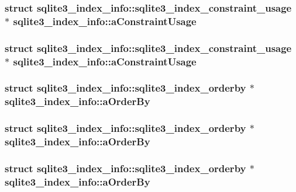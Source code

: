 \subsubsection{\setlength{\rightskip}{0pt plus 5cm}struct \bf{sqlite3\_\-index\_\-info::sqlite3\_\-index\_\-constraint\_\-usage} $\ast$ \bf{sqlite3\_\-index\_\-info::a\-Constraint\-Usage}}\label{structsqlite3__index__info_7f177b25117e4425b2bc509076cb7c31}


\subsubsection{\setlength{\rightskip}{0pt plus 5cm}struct \bf{sqlite3\_\-index\_\-info::sqlite3\_\-index\_\-constraint\_\-usage} $\ast$ \bf{sqlite3\_\-index\_\-info::a\-Constraint\-Usage}}\label{structsqlite3__index__info_7f177b25117e4425b2bc509076cb7c31}


\subsubsection{\setlength{\rightskip}{0pt plus 5cm}struct \bf{sqlite3\_\-index\_\-info::sqlite3\_\-index\_\-orderby} $\ast$ \bf{sqlite3\_\-index\_\-info::a\-Order\-By}}\label{structsqlite3__index__info_3fb9eec1125f04d125be09bebbd05b18}


\subsubsection{\setlength{\rightskip}{0pt plus 5cm}struct \bf{sqlite3\_\-index\_\-info::sqlite3\_\-index\_\-orderby} $\ast$ \bf{sqlite3\_\-index\_\-info::a\-Order\-By}}\label{structsqlite3__index__info_3fb9eec1125f04d125be09bebbd05b18}


\subsubsection{\setlength{\rightskip}{0pt plus 5cm}struct \bf{sqlite3\_\-index\_\-info::sqlite3\_\-index\_\-orderby} $\ast$ \bf{sqlite3\_\-index\_\-info::a\-Order\-By}}\label{structsqlite3__index__info_3fb9eec1125f04d125be09bebbd05b18}


